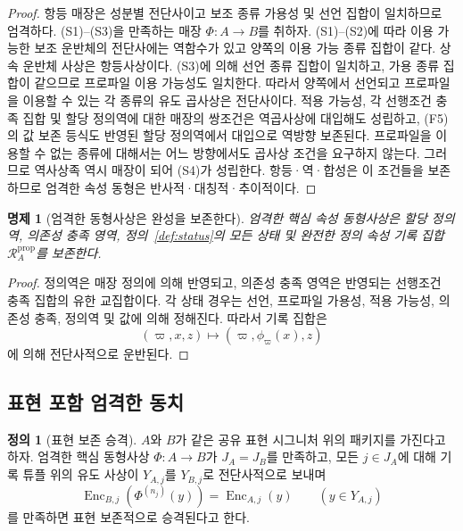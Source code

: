 \documentclass[11pt]{article}
\newcommand{\PropRec}{\mathcal R^{\mathrm{prop}}}
\newcommand{\Enc}{\operatorname{Enc}}
\newtheorem{proposition}[theorem]{명제}
\theoremstyle{definition}
\newtheorem{definition}[theorem]{정의}
\theoremstyle{remark}
\begin{document}
\begin{proof}
항등 매장은 성분별 전단사이고 보조 종류 가용성 및 선언 집합이 일치하므로 엄격하다.
(S1)--(S3)을 만족하는 매장 \(\Phi:A\to B\)를 취하자.
(S1)--(S2)에 따라 이용 가능한 보조 운반체의 전단사에는 역함수가 있고 양쪽의 이용 가능 종류 집합이 같다. 상속 운반체 사상은 항등사상이다.
(S3)에 의해 선언 종류 집합이 일치하고, 가용 종류 집합이 같으므로 프로파일 이용 가능성도 일치한다.
따라서 양쪽에서 선언되고 프로파일을 이용할 수 있는 각 종류의 유도 곱사상은 전단사이다.
적용 가능성, 각 선행조건 충족 집합 및 할당 정의역에 대한 매장의 쌍조건은 역곱사상에 대입해도 성립하고, (F5)의 값 보존 등식도 반영된 할당 정의역에서 대입으로 역방향 보존된다.
프로파일을 이용할 수 없는 종류에 대해서는 어느 방향에서도 곱사상 조건을 요구하지 않는다.
그러므로 역사상족 역시 매장이 되어 (S4)가 성립한다.
항등·역·합성은 이 조건들을 보존하므로 엄격한 속성 동형은 반사적·대칭적·추이적이다.
\end{proof}

\begin{proposition}[엄격한 동형사상은 완성을 보존한다]
엄격한 핵심 속성 동형사상은 할당 정의역, 의존성 충족 영역, 정의~\ref{def:status}의 모든 상태 및 완전한 정의 속성 기록 집합 \(\PropRec_A\)를 보존한다.
\end{proposition}

\begin{proof}
정의역은 매장 정의에 의해 반영되고, 의존성 충족 영역은 반영되는 선행조건 충족 집합의 유한 교집합이다. 각 상태 경우는 선언, 프로파일 가용성, 적용 가능성, 의존성 충족, 정의역 및 값에 의해 정해진다.
따라서 기록 집합은
\[
(\varpi,x,z)\longmapsto(\varpi,\phi_{\varpi}(x),z)
\]
에 의해 전단사적으로 운반된다.
\end{proof}

\subsection{표현 포함 엄격한 동치}

\begin{definition}[표현 보존 승격]
\(A\)와 \(B\)가 같은 공유 표현 시그니처 위의 패키지를 가진다고 하자.
엄격한 핵심 동형사상 \(\Phi:A\to B\)가 \(J_A=J_B\)를 만족하고, 모든 \(j\in J_A\)에 대해 기록 튜플 위의 유도 사상이 \(Y_{A,j}\)를 \(Y_{B,j}\)로 전단사적으로 보내며
\[
\Enc_{B,j}(\Phi^{(n_j)}(y))=\Enc_{A,j}(y)
\qquad
(y\in Y_{A,j})
\]
를 만족하면 표현 보존적으로 승격된다고 한다.
\end{definition}
\end{document}
